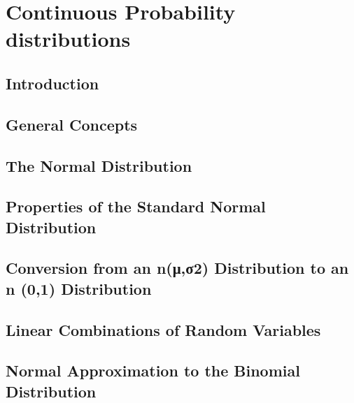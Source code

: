 \documentclass[12pt,]{article}
\begin{document}
\hypertarget{continuous-probability-distributions}{%
\section{Continuous Probability
distributions}\label{continuous-probability-distributions}}

\hypertarget{introduction-1}{%
\subsection{Introduction}\label{introduction-1}}

\hypertarget{general-concepts}{%
\subsection{General Concepts}\label{general-concepts}}

\hypertarget{the-normal-distribution}{%
\subsection{The Normal Distribution}\label{the-normal-distribution}}

\hypertarget{properties-of-the-standard-normal-distribution}{%
\subsection{Properties of the Standard Normal
Distribution}\label{properties-of-the-standard-normal-distribution}}

\hypertarget{conversion-from-an-n2-distribution-to-an-n-01-distribution}{%
\subsection{Conversion from an n(μ,σ2) Distribution to an n (0,1)
Distribution}\label{conversion-from-an-n2-distribution-to-an-n-01-distribution}}

\hypertarget{linear-combinations-of-random-variables}{%
\subsection{Linear Combinations of Random
Variables}\label{linear-combinations-of-random-variables}}

\hypertarget{normal-approximation-to-the-binomial-distribution}{%
\subsection{Normal Approximation to the Binomial
Distribution}\label{normal-approximation-to-the-binomial-distribution}}
\end{document}

